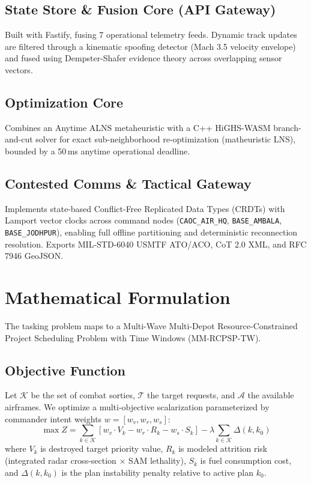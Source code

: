\documentclass[10pt,twocolumn,a4paper]{article}
\begin{document}
\subsection{State Store \& Fusion Core (API Gateway)}
Built with Fastify, fusing 7 operational telemetry feeds. Dynamic track updates are filtered through a kinematic spoofing detector (Mach 3.5 velocity envelope) and fused using Dempster-Shafer evidence theory across overlapping sensor vectors.

\subsection{Optimization Core}
Combines an Anytime ALNS metaheuristic with a C++ HiGHS-WASM branch-and-cut solver for exact sub-neighborhood re-optimization (matheuristic LNS), bounded by a 50\,ms anytime operational deadline.

\subsection{Contested Comms \& Tactical Gateway}
Implements state-based Conflict-Free Replicated Data Types (CRDTs) with Lamport vector clocks across command nodes (\texttt{CAOC\_AIR\_HQ}, \texttt{BASE\_AMBALA}, \texttt{BASE\_JODHPUR}), enabling full offline partitioning and deterministic reconnection resolution. Exports MIL-STD-6040 USMTF ATO/ACO, CoT 2.0 XML, and RFC 7946 GeoJSON.

\vspace{-0.5em}
\section{Mathematical Formulation}
\footnotesize
The tasking problem maps to a Multi-Wave Multi-Depot Resource-Constrained Project Scheduling Problem with Time Windows (MM-RCPSP-TW).

\subsection{Objective Function}
Let $\mathcal{K}$ be the set of combat sorties, $\mathcal{T}$ the target requests, and $\mathcal{A}$ the available airframes. We optimize a multi-objective scalarization parameterized by commander intent weights $w = [w_v, w_r, w_s]$:
\begin{equation}
\max Z = \sum_{k \in \mathcal{K}} \left[ w_v \cdot V_k - w_r \cdot R_k - w_s \cdot S_k \right] - \lambda \sum_{k \in \mathcal{K}} \Delta(k, k_0)
\end{equation}
where $V_k$ is destroyed target priority value, $R_k$ is modeled attrition risk (integrated radar cross-section $\times$ SAM lethality), $S_k$ is fuel consumption cost, and $\Delta(k, k_0)$ is the plan instability penalty relative to active plan $k_0$.
\end{document}
